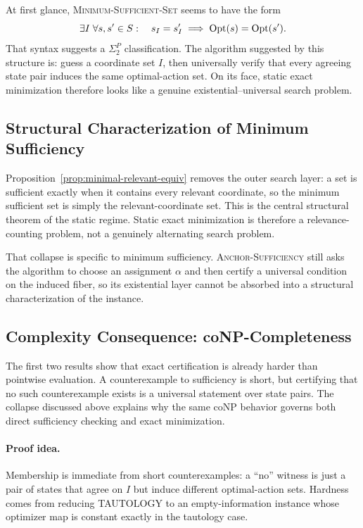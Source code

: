 At first glance, \textsc{Minimum-Sufficient-Set} seems to have the form
\[
\exists I\; \forall s,s'\in S:
\quad s_I=s'_I \implies \mathrm{Opt}(s)=\mathrm{Opt}(s').
\]
That syntax suggests a $\Sigma_2^P$ classification. The algorithm suggested by this structure is: guess a coordinate set $I$, then universally verify that every agreeing state pair induces the same optimal-action set. On its face, static exact minimization therefore looks like a genuine existential--universal search problem.

\subsection{Structural Characterization of Minimum Sufficiency}

Proposition~\ref{prop:minimal-relevant-equiv} removes the outer search layer: a set is sufficient exactly when it contains every relevant coordinate, so the minimum sufficient set is simply the relevant-coordinate set. This is the central structural theorem of the static regime. Static exact minimization is therefore a relevance-counting problem, not a genuinely alternating search problem.

That collapse is specific to minimum sufficiency. \textsc{Anchor-Sufficiency} still asks the algorithm to choose an assignment $\alpha$ and then certify a universal condition on the induced fiber, so its existential layer cannot be absorbed into a structural characterization of the instance.

\subsection{Complexity Consequence: coNP-Completeness}

The first two results show that exact certification is already harder than pointwise evaluation. A counterexample to sufficiency is short, but certifying that no such counterexample exists is a universal statement over state pairs. The collapse discussed above explains why the same coNP behavior governs both direct sufficiency checking and exact minimization.

\paragraph{Proof idea.}
Membership is immediate from short counterexamples: a ``no'' witness is just a pair of states that agree on $I$ but induce different optimal-action sets. Hardness comes from reducing TAUTOLOGY to an empty-information instance whose optimizer map is constant exactly in the tautology case.

